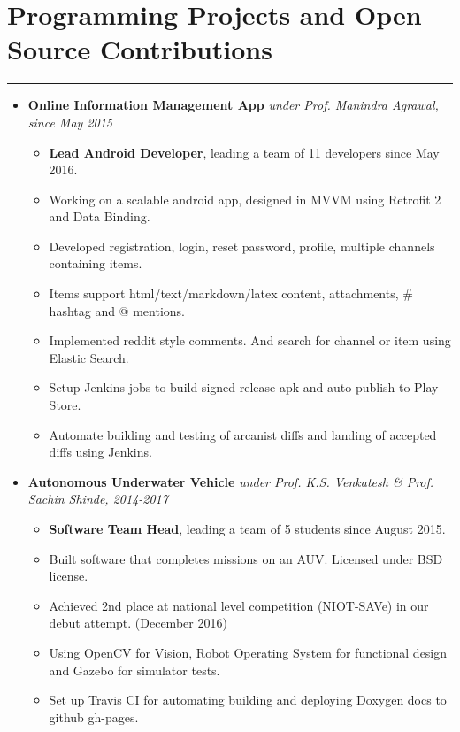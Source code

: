 \documentclass[a4paper]{article}
\begin{document}
\section*{Programming Projects and Open Source Contributions}
\hrule
\vspace{3mm}
\begin{itemize}
	\item
	      \textbf{Online Information Management App}
	      \hfill \textit{under Prof. Manindra Agrawal, since May 2015}
	      \begin{itemize}
	      	\vspace{-2mm} \setlength\itemsep{-0.2em}
		\item \textbf{Lead Android Developer}, leading a team of 11 developers since May 2016.
	      	\item Working on a scalable android app, designed in MVVM using Retrofit 2 and Data Binding.
	      	\item Developed registration, login, reset password, profile, multiple channels containing items.
	      	\item Items support html/text/markdown/latex content, attachments, \# hashtag and @ mentions.
	      	\item Implemented reddit style comments. And search for channel or item using Elastic Search.
	      	\item Setup Jenkins jobs to build signed release apk and auto publish to Play Store.
	      	\item Automate building and testing of arcanist diffs and landing of accepted diffs using Jenkins.
	      \end{itemize}
	\item
	      \textbf{Autonomous Underwater Vehicle}
	      \hfill \textit{under Prof. K.S. Venkatesh \& Prof. Sachin Shinde, 2014-2017}
	      \begin{itemize}
	      	\vspace{-2mm} \setlength\itemsep{-0.2em}
		\item \textbf{Software Team Head}, leading a team of 5 students since August 2015.
		\item Built software that completes missions on an AUV. Licensed under BSD license.
		\item Achieved 2nd place at national level competition (NIOT-SAVe) in our debut attempt. (December 2016)
		\item Using OpenCV for Vision, Robot Operating System for functional design and Gazebo for simulator tests.
	      	\item Set up Travis CI for automating building and deploying Doxygen docs to github gh-pages.

\end{itemize}
\end{itemize}
\end{document}
